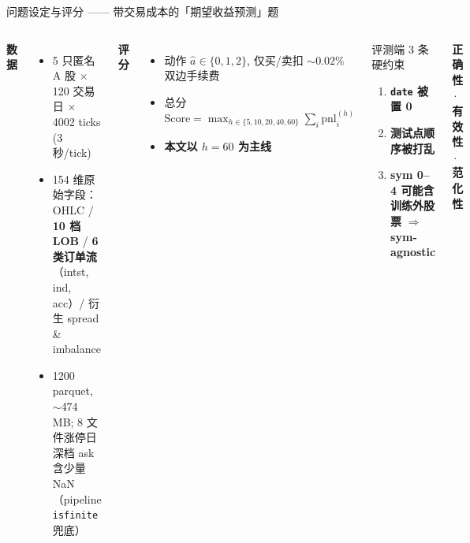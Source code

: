 \documentclass[aspectratio=169,11pt]{beamer}
\newcommand{\hl}[1]{\textcolor{lblue}{\textbf{#1}}}
\begin{document}
\begin{frame}{问题设定与评分 —— 带交易成本的「期望收益预测」题}
  \begin{columns}[T,onlytextwidth]
    \textbf{\color{icmlblue}数据}
    \begin{itemize}\setlength{\itemsep}{2pt}
      \item 5 只匿名 A 股 $\times$ 120 交易日 $\times$ 4002 ticks (3 秒/tick)
      \item 154 维原始字段：OHLC / \textbf{10 档 LOB} / \textbf{6 类订单流}（intst, ind, acc）/ 衍生 spread \& imbalance
      \item 1200 parquet, $\sim$474 MB; 8 文件涨停日深档 ask 含少量 NaN（pipeline \texttt{isfinite} 兜底）
    \end{itemize}
    \vspace{4pt}
    \textbf{\color{icmlblue}评分}
    \begin{itemize}\setlength{\itemsep}{2pt}
      \item 动作 $\hat a\!\in\!\{0,1,2\}$, 仅买/卖扣 $\sim\!0.02\%$ 双边手续费
      \item 总分 $\mathrm{Score}=\max_{h\in\{5,10,20,40,60\}}\sum_i\mathrm{pnl}_i^{(h)}$
      \item \hl{本文以 $h{=}60$ 为主线}
    \end{itemize}

    \begin{block}{\color{accred}\large 评测端 3 条硬约束}
      \normalsize
      \begin{enumerate}\setlength{\itemsep}{4pt}
        \item \textbf{\texttt{date} 被置 0}
        \item \textbf{测试点顺序被打乱}
        \item \textbf{sym 0--4 可能含训练外股票} $\Rightarrow$ \textbf{sym-agnostic}
      \end{enumerate}
    \end{block}
    \vspace{6pt}
    \begin{center}\normalsize
      \hl{正确性} \,$\cdot$\, \hl{有效性} \,$\cdot$\, \hl{范化性}
    \end{center}
  \end{columns}
\end{frame}
\end{document}
